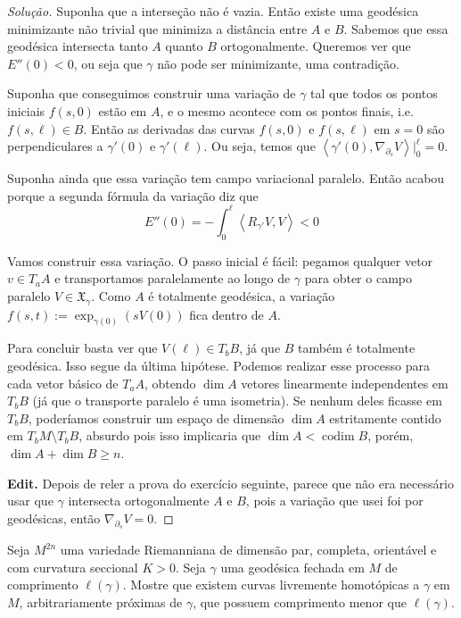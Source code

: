 \begin{proof}[Solução]
Suponha que a interseção não é vazia. Então existe uma geodésica minimizante não
trivial que minimiza a distância entre $A$ e $B$. Sabemos que essa geodésica
intersecta tanto $A$ quanto $B$ ortogonalmente. Queremos ver que $E''(0)<0$, ou
seja que $\gamma$ não pode ser minimizante, uma contradição.

Suponha que conseguimos construir uma variação de $\gamma$ tal que todos os
pontos iniciais $f(s,0)$ estão em $A$, e o mesmo acontece com os pontos finais,
i.e. $f(s,\ell) \in B$. Então as derivadas das curvas $f(s,0)$ e $f(s,\ell)$ em
$s=0$ são perpendiculares a  $\gamma'(0)$ e $\gamma'(\ell)$. Ou seja, temos que
$\left<\gamma'(0),\nabla_{\partial_s}V\right>|_{0}^\ell=0$.

Suponha ainda que essa variação tem campo variacional paralelo. Então acabou
porque a segunda fórmula da variação diz que \[E''(0)=-\int_0^\ell
\left<R_{\gamma'}V,V\right><0\]

Vamos construir essa variação. O passo inicial é fácil: pegamos qualquer vetor
$v \in T_a A$ e transportamos paralelamente ao longo de $\gamma$ para obter o
campo paralelo $V \in \mathfrak{X}_\gamma$. Como $A$ é totalmente geodésica, a
variação $f(s,t):=\operatorname{exp}_{\gamma(0)}(sV(0))$ fica dentro de $A$.

Para concluir basta ver que $ V(\ell) \in T_bB$, já que $B$ também é totalmente
geodésica. Isso segue da última hipótese. Podemos realizar esse processo para
cada vetor básico de  $T_a A$, obtendo $\dim A$ vetores linearmente
independentes em $T_bB$ (já que o transporte paralelo é uma isometria). Se
nenhum deles ficasse em $T_bB$, poderíamos construir um espaço de dimensão $\dim
A$ estritamente contido em $T_b M\setminus T_b B$, absurdo pois isso implicaria
que $\dim A< \operatorname{codim} B$, porém, $\dim A+ \dim B \geq n$.

\textbf{Edit.} Depois de reler a prova do exercício seguinte, parece que não era
necessário usar que $\gamma$ intersecta ortogonalmente $A$ e $B$, pois a
variação que usei foi por geodésicas, então $\nabla_{\partial_s}V=0$.
\end{proof}

\begin{exercise}
\label{exercise-free-homotopy-variation}
Seja $M^{2n}$ uma variedade Riemanniana de dimensão par, completa, orientável e
com curvatura seccional $K>0$. Seja $\gamma$ uma geodésica fechada em $M$ de
comprimento $\ell(\gamma)$. Mostre que existem curvas livremente homotópicas a
$\gamma$ em $M$, arbitrariamente próximas de $\gamma$, que possuem comprimento
menor que $\ell(\gamma)$.
\end{exercise}

